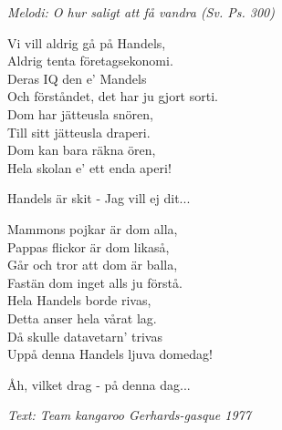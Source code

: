 {\footnotesize\textit{Melodi: O hur saligt att få vandra (Sv. Ps. 300)}}\par
\vspace{10pt}
\par
Vi vill aldrig gå på Handels,\\
Aldrig tenta företagsekonomi.\\
Deras IQ den e' Mandels\\
Och förståndet, det har ju gjort sorti.\\
Dom har jätteusla snören,\\
Till sitt jätteusla draperi.\\
Dom kan bara räkna ören,\\
Hela skolan e' ett enda aperi!\par
\vspace{10pt}
Handels är skit - Jag vill ej dit...\par
\vspace{10pt}
Mammons pojkar är dom alla,\\
Pappas flickor är dom likaså,\\
Går och tror att dom är balla,\\
Fastän dom inget alls ju förstå.\\
Hela Handels borde rivas,\\
Detta anser hela vårat lag.\\
Då skulle datavetarn' trivas\\
Uppå denna Handels ljuva domedag!\par
\vspace{10pt}
Åh, vilket drag - på denna dag...\par
\vspace{10pt}
{\footnotesize\textit{Text: Team kangaroo Gerhards-gasque 1977}}
